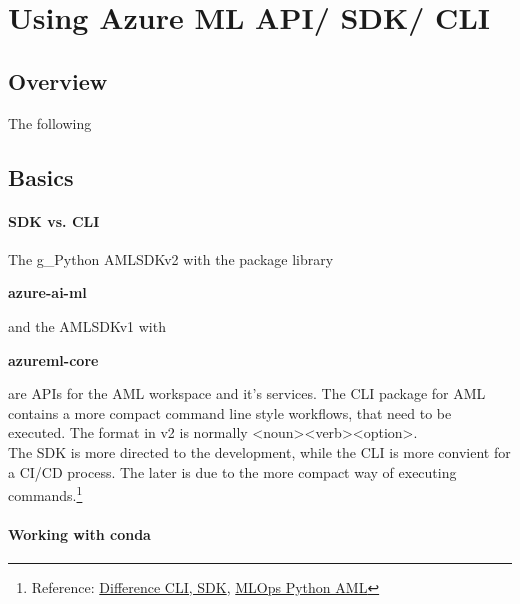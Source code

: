 \section{Using Azure ML API/ SDK/ CLI}
\subsection{Overview}
The following
\subsection{Basics}
\paragraph{SDK vs. CLI}
The \gls{g_Python} \gls{AMLSDKv2} with the package library
\begin{center}
	\textbf{azure-ai-ml}
\end{center}
and the \gls{AMLSDKv1} with 
\begin{center}
	\textbf{azureml-core}
\end{center}
are \gls{API}s for the \gls{AML} workspace and it's services. The \gls{CLI} package for \gls{AML} contains a more compact command line style workflows, that need to be executed. The format in v2 is normally <noun><verb><option>.\\

The \gls{SDK} is more directed to the development, while the \gls{CLI} is more convient for a \gls{CI}/\gls{CD} process. The later is due to the more compact way of executing commands.\footnote{Reference: \href{https://learn.microsoft.com/en-us/answers/questions/1395777/what-is-the-difference-between-azure-ail-ml-and-az}{Difference CLI, SDK}, \href{https://github.com/microsoft/MLOps}{MLOps Python AML}
}

\paragraph{Working with conda}


